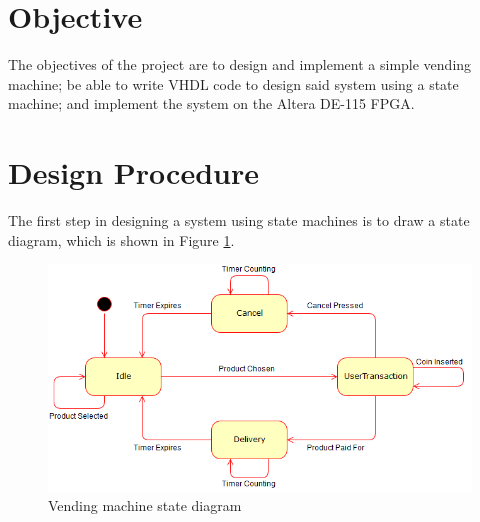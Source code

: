 \documentclass[12pt]{article}
\begin{document}

\newpage

\section{Objective} \label{sec:obj}
The objectives of the project are to design and implement a simple vending machine; be able to write VHDL code to design said system using a state machine; and implement the system on the Altera DE-115 FPGA.

\section{Design Procedure} \label{sec:desproc}
The first step in designing a system using state machines is to draw a state diagram, which is shown in Figure \ref{fig:toplevel}.

\begin{figure}[!h]
\setlength{\belowcaptionskip}{-10pt}
\begin{center}
\includegraphics[scale=0.6]{StateDiagram.png}
\caption{Vending machine state diagram}
\label{fig:toplevel}
\end{center}
\end{figure}
\end{document}
